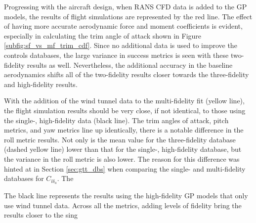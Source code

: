 Progressing with the aircraft design, when RANS CFD data is added to the GP models, the results of flight simulations are represented by the red line. 
The effect of having more accurate aerodynamic force and moment coefficients is evident, especially in calculating the trim angle of attack shown in Figure \ref{subfig:sf_vs_mf_trim_cdf}.
Since no additional data is used to improve the controls databases, the large variance in success metrics is seen with these two-fidelity results as well. 
Nevertheless, the additional accuracy in the baseline aerodynamics shifts all of the two-fidelity results closer towards the three-fidelity and high-fidelity results.

With the addition of the wind tunnel data to the multi-fidelity fit (yellow line), the flight simulation results should be very close, if not identical, to those using the single-, high-fidelity data (black line). 
The trim angles of attack, pitch metrics, and yaw metrics line up identically, there is a notable difference in the roll metric results. 
Not only is the mean value for the three-fidelity database (dashed yellow line) lower than that for the single-, high-fidelity database, but the variance in the roll metric is also lower. 
The reason for this difference was hinted at in Section \ref{sec:gtt_dbs} when comparing the single- and multi-fidelity databases for $C_{l{\delta_a}}$. 
The 



The black line represents the results using the high-fidelity GP models that only use wind tunnel data. 
Across all the metrics, adding levels of fidelity bring the results closer to the sing
